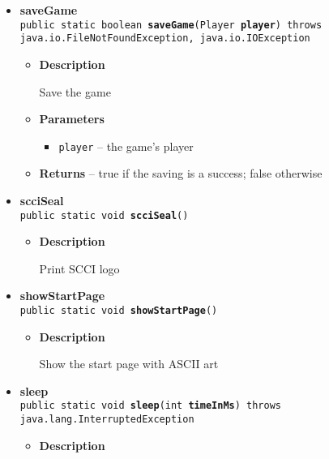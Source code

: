 {{{\begin{itemize}
{\begin{itemize}
{Generate a random number in a certain range
}
\item{
{\bf  Parameters}
  \begin{itemize}
   \item{
\texttt{min} -- the minimum for the number, inclusive}
   \item{
\texttt{max} -- the maximum for the number, inclusive}
  \end{itemize}
}%
\item{{\bf  Returns} -- 
the generated number 
}%
\end{itemize}
}%
\item{ 
{\bf  saveGame}\\
\texttt{public static boolean\ {\bf  saveGame}(\texttt{Player} {\bf  player}) throws java.io.FileNotFoundException, java.io.IOException
\label{personOfInterest.Game.saveGame(personOfInterest.Player)}}%
\begin{itemize}
\item{
{\bf  Description}

Save the game
}
\item{
{\bf  Parameters}
  \begin{itemize}
   \item{
\texttt{player} -- the game's player}
  \end{itemize}
}%
\item{{\bf  Returns} -- 
true if the saving is a success; false otherwise 
}%
\end{itemize}
}%
\item{ 
{\bf  scciSeal}\\
\texttt{public static void\ {\bf  scciSeal}()
\label{personOfInterest.Game.scciSeal()}}%
\begin{itemize}
\item{
{\bf  Description}

Print SCCI logo
}
\end{itemize}
}%
\item{ 
{\bf  showStartPage}\\
\texttt{public static void\ {\bf  showStartPage}()
\label{personOfInterest.Game.showStartPage()}}%
\begin{itemize}
\item{
{\bf  Description}

Show the start page with ASCII art
}
\end{itemize}
}%
\item{ 
{\bf  sleep}\\
\texttt{public static void\ {\bf  sleep}(\texttt{int} {\bf  timeInMs}) throws java.lang.InterruptedException
\label{personOfInterest.Game.sleep(int)}}%
\begin{itemize}
\item{
{\bf  Description}

}
\end{itemize}}
\end{itemize}}}}

